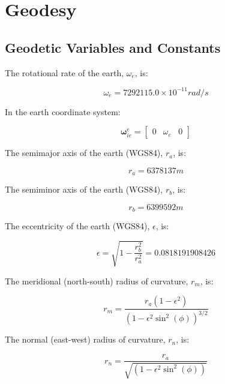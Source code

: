 \documentclass[a4paper]{report}
\numberwithin{equation}{chapter}
\newcommand{\mat}[1]{\boldsymbol{#1}}
\begin{document}
\section[Geodesy]{Geodesy}

\subsection[Geodetic Variables and Constants]{Geodetic Variables and Constants}

The rotational rate of the earth, $\omega_e$, is:

\begin{equation}
\omega_e = 7292115.0 \times 10^{-11}  rad / s
\end{equation}

In the earth coordinate system:

\begin{equation}
\mat{\omega}^e_{ie} = 
\begin{bmatrix}
 0 & \omega_e & 0
 \end{bmatrix}
\end{equation}

The semimajor axis of the earth (WGS84), $r_a$, is:

\begin{equation}
r_a = 6378137 m
\end{equation}

The semiminor axis of the earth (WGS84), $r_b$, is:

\begin{equation}
r_b = 6399592 m
\end{equation}

The eccentricity of the earth (WGS84), $\epsilon$, is:

\begin{equation}
\epsilon = \sqrt{1 - \frac{r^2_b}{r^2_a}} = 0.0818191908426
\end{equation}

The meridional (north-south) radius of curvature, $r_m$, is:

\begin{equation}
r_m = \frac{r_a \left(1 - \epsilon^2 \right)}{\left(1 - \epsilon^2\sin^2\left(\phi\right)\right)^{3/2}}
\end{equation}

The normal (east-west) radius of curvature, $r_n$, is:

\begin{equation}
r_n = \frac{r_a}{\sqrt{\left(1 - \epsilon^2\sin^2\left(\phi\right)\right)}}
\end{equation}
\end{document}
